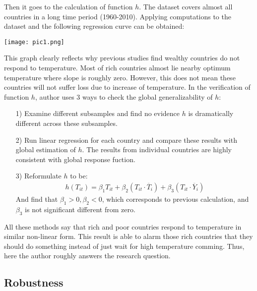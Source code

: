 \documentclass[letterpaper]{article}
\begin{document}
Then it goes to the calculation of function $h$. The dataset covers almost all countries in a long time period (1960-2010). Applying computations to the dataset and the following regression curve can be obtained:
\begin{center}
  \texttt{[image: pic1.png]}
\end{center}
This graph clearly reflects why previous studies find wealthy countries do not respond to temperature. Most of rich countries almost lie nearby optimum temperature where slope is roughly zero. However, this does not mean these countries will not suffer loss due to increase of temperature. In the verification of function $h$, author uses 3 ways to check the global generalizability of $h$:
\begin{itemize}
\item[1)] Examine different subsamples and find no evidence $h$ is dramatically different across these subsamples. 
\item[2)] Run linear regression for each country and compare these results with global estimation of $h$. The results from individual countries are highly consistent with global response fuction. 
\item[3)] Reformulate $h$ to be:
  \begin{eqnarray}
    h(T_{it}) = \beta_1T_{it} + \beta_2(T_{it}\cdot \overline{T}_i) + \beta_3(T_{it}\cdot \overline{Y}_i)
  \end{eqnarray}
  And find that $\beta_1>0,\beta_2<0$, which corresponds to previous calculation, and $\beta_3$ is not significant different from zero. 
\end{itemize}
All these methods say that rich and poor countries respond to temperature in similar non-linear form. This result is able to alarm those rich countries that they should do something instead of just wait for high temperature comming. Thus, here the author roughly answers the research question. 

\subsection{Robustness}
\end{document}
